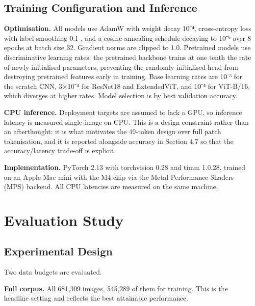 \hypertarget{training-configuration-and-inference}{%
\subsection{Training Configuration and
Inference}\label{training-configuration-and-inference}}

\textbf{Optimisation.} All models use AdamW \citep{ref53} with weight
decay 10⁻⁴, cross-entropy loss with label smoothing 0.1
\citep{ref55,ref56}, and a cosine-annealing schedule \citep{ref54}
decaying to 10⁻⁶ over 8 epochs at batch size 32. Gradient norms
are clipped to 1.0. Pretrained models use discriminative learning rates:
the pretrained backbone trains at one tenth the rate of newly
initialised parameters, preventing the randomly initialised head from
destroying pretrained features early in training. Base learning rates
are 10⁻³ for the scratch CNN, 3×10⁻⁴ for ResNet18 and ExtendedViT, and
10⁻⁴ for ViT-B/16, which diverges at higher rates. Model selection is by
best validation accuracy.

\textbf{CPU inference.} Deployment targets are assumed to lack a GPU, so
inference latency is measured single-image on CPU. This is a design
constraint rather than an afterthought: it is what motivates the
49-token design over full patch tokenisation, and it is reported
alongside accuracy in Section 4.7 so that the accuracy/latency trade-off
is explicit.

\textbf{Implementation.} PyTorch 2.13 with torchvision 0.28 and timm
1.0.28, trained on an Apple Mac mini with the M4 chip via the Metal Performance Shaders (MPS) backend. All CPU latencies are measured on the same machine.


\hypertarget{evaluation-study}{%
\section{Evaluation Study}\label{evaluation-study}}

\hypertarget{experimental-design}{%
\subsection{Experimental Design}\label{experimental-design}}

Two data budgets are evaluated.

\textbf{Full corpus.} All 681,309 images, 545,289 of them for training.
This is the headline setting and reflects the best attainable
performance.

